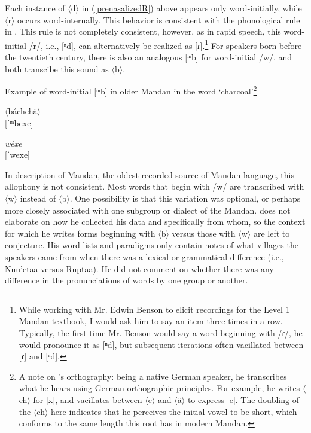Each instance of $\langle$d$\rangle$ in (\ref{prenasalizedR}) above appears only word-initially, while $\langle$r$\rangle$ occurs word-internally. This behavior is consistent with the phonological rule in \citet[52]{hollow1970}. This rule is not completely consistent, however, as in rapid speech, this word-initial /r/, i.e., [ⁿd], can alternatively be realized as [ɾ].\footnote{While working with Mr. Edwin Benson to elicit recordings for the Level 1 Mandan textbook, I would ask him to say an item three times in a row. Typically, the first time Mr. Benson would say a word beginning with /ɾ/, he would pronounce it as [ⁿd], but subsequent iterations often vacillated between [ɾ] and [ⁿd].} For speakers born before the twentieth century, there is also an analogous [ᵐb] for word-initial /w/. \citet{maximilian1839} and \citet{will1906} both transcibe this sound as $\langle$b$\rangle$.

\begin{exe}
\item\label{mbexample} Example of word-initial [ᵐb] in older Mandan in the word `charcoal'\footnote{A note on \citeauthor{maximilian1839}'s orthography: being a native German speaker, he transcribes what he hears using German orthographic principles. For example, he writes $\langle$ch$\rangle$ for [x], and vacillates between $\langle$e$\rangle$ and $\langle$ä$\rangle$ to express [e]. The doubling of the $\langle$ch$\rangle$ here indicates that he perceives the initial vowel to be short, which conforms to the same length this root has in modern Mandan.}
\begin{xlist}

\item $\langle$bä́chchä$\rangle$ \citep[236]{maximilian1839}\\{}[ˈᵐbexe]

\item \textit{wéxe} \citep[285]{hollow1970}\\{}[ˈwexe]

\end{xlist}

\end{exe}

In  description of Mandan, the oldest recorded source of Mandan language, this allophony is not consistent. Most words that begin with /w/ are transcribed with $\langle$w$\rangle$ instead of $\langle$b$\rangle$. One possibility is that this variation was optional, or perhaps more closely associated with one subgroup or dialect of the Mandan. \citeauthor{maximilian1839} does not elaborate on how he collected his data and specifically from whom, so the context for which he writes forms beginning with $\langle$b$\rangle$ versus those with $\langle$w$\rangle$ are left to conjecture. His word lists and paradigms only contain notes of what villages the speakers came from when there was a lexical or grammatical difference (i.e., Nuu'etaa versus Ruptaa). He did not comment on whether there was any difference in the pronunciations of words by one group or another.


